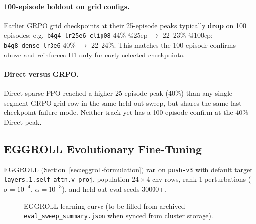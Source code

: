\paragraph{100-episode holdout on grid configs.}
Earlier GRPO grid checkpoints at their 25-episode peaks typically \textbf{drop} on 100 episodes: e.g.\ \texttt{b4g4\_lr25e6\_clip08} 44\% @25ep $\rightarrow$ 22--23\% @100ep; \texttt{b4g8\_dense\_lr3e6} 40\% $\rightarrow$ 22--24\%. This matches the 100-episode confirms above and reinforces H1 only for early-selected checkpoints.

\paragraph{Direct versus GRPO.}
Direct sparse PPO reached a higher 25-episode peak (40\%) than any single-segment GRPO grid row in the same held-out sweep, but shares the same last-checkpoint failure mode. Neither track yet has a 100-episode confirm at the 40\% Direct peak.

\FloatBarrier
\subsection{EGGROLL Evolutionary Fine-Tuning}
\label{sec:eggroll-results}

EGGROLL (Section~\ref{sec:eggroll-formulation}) ran on \texttt{push-v3} with default target \texttt{layers.1.self\_attn.v\_proj}, population $24\times4$ env rows, rank-1 perturbations ($\sigma{=}10^{-4}$, $\alpha{=}10^{-3}$), and held-out eval seeds 30000+.

\begin{figure}[H]
\centering
{}
\caption{EGGROLL learning curve (to be filled from archived \texttt{eval\_sweep\_summary.json} when synced from cluster storage).}
\label{fig:eggroll-curve-placeholder}
\end{figure}

